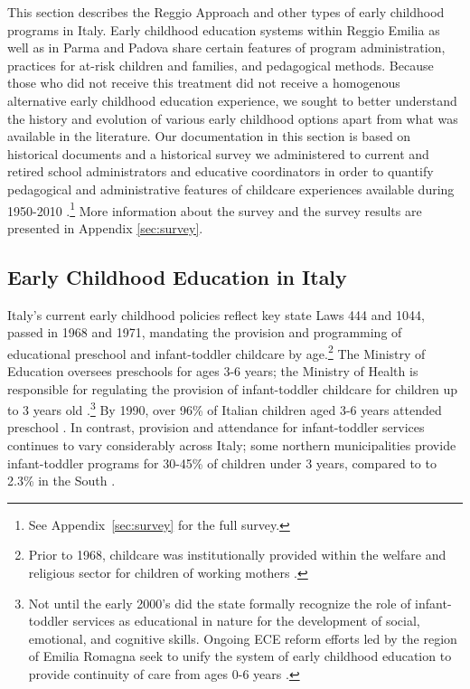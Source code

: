 This section describes the Reggio Approach and other types of early childhood programs in Italy. Early childhood education systems within Reggio Emilia as well as in Parma and Padova share certain features of program administration, practices for at-risk children and families, and pedagogical methods. Because those who did not receive this treatment did not receive a homogenous alternative early childhood education experience, we sought to better understand the history and evolution of various early childhood options apart from what was available in the literature. Our documentation in this section is based on historical documents \citep{Padova-Admin-Data_1964-2011,Reggio-Admin-data_1966-2006,Reggio-Annual-Journals_1994-2011} and a historical survey we administered to current and retired school administrators and educative coordinators in order to quantify pedagogical and administrative features of childcare experiences available during 1950-2010 \citep{CEHD_2016_Historical-Analysis}.\footnote{See Appendix~\ref{sec:survey} for the full survey.} More information about the survey and the survey results are presented in Appendix \ref{sec:survey}.


\subsection{Early Childhood Education in Italy}

Italy's current early childhood policies reflect key state Laws 444 and 1044, passed in 1968 and 1971, mandating the provision and programming of educational preschool and infant-toddler childcare by age.\footnote{Prior to 1968, childcare was institutionally provided within the welfare and religious sector for children of working mothers \citep{OECD_2001_Italy-Country-Note,Hohnerlein_2015_Development-and-Diffusion}.} The Ministry of Education oversees preschools for ages 3-6 years; the Ministry of Health is responsible for regulating the provision of infant-toddler childcare for children up to 3 years old \citep{Corsaro_1996_Early-Edu}.\footnote{Not until the early 2000's did the state formally recognize the role of infant-toddler services as educational in nature for the development of social, emotional, and cognitive skills. Ongoing ECE reform efforts led by the region of Emilia Romagna seek to unify the system of early childhood education to provide continuity of care from ages 0-6 years \citep{CEHD_2016_Historical-Analysis}.} By 1990, over 96\% of Italian children aged 3-6 years attended preschool \citep{Hohnerlein_2015_Development-and-Diffusion}. In contrast, provision and attendance for infant-toddler services continues to vary considerably across Italy; some northern municipalities provide infant-toddler programs for 30-45\% of children under 3 years, compared to to 2.3\% in the South \citep{Becchi-Ferrari_1990_Pub-Inf-Centres-Italy,Musatti-Picchio_2010_IJEC}. 


